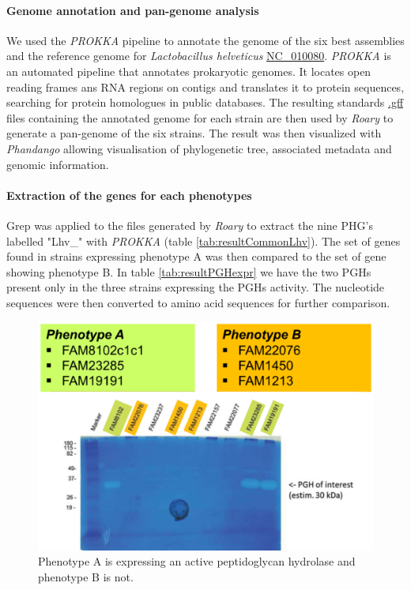 \documentclass[10pt,a4paper]{article}
\begin{document}
\paragraph{Genome annotation and pan-genome analysis}
We used the \textit{PROKKA} pipeline\cite{seemann_prokka:_2014} to annotate the genome of the six best assemblies and the reference genome for \textit{Lactobacillus helveticus} \href{https://www.ncbi.nlm.nih.gov/genome/?term=NC_010080}{NC\_010080}. \textit{PROKKA} is an automated pipeline that annotates prokaryotic genomes. It locates open reading frames ans RNA regions on contigs and translates it to protein sequences, searching for protein homologues in public databases. The resulting standards \href{https://www.ensembl.org/info/website/upload/gff.html}{.gff} files containing the annotated genome for each strain are then used by \textit{Roary}\cite{page_roary:_2015} to generate a pan-genome of the six strains. The result was then visualized with \textit{Phandango}\cite{hadfield_phandango:_2018} allowing visualisation of phylogenetic tree, associated metadata and genomic information.


\paragraph{Extraction of the genes for each phenotypes} Grep was applied to the files generated by \textit{Roary} to extract the nine PHG's \cite{jebava_nine_2011} labelled "Lhv\_" with \textit{PROKKA} (table \ref{tab:resultCommonLhv}). The set of genes found in strains expressing phenotype A was then compared to the set of gene showing phenotype B. In table \ref{tab:resultPGHexpr} we have the two PGHs present only in the three strains expressing the PGHs activity. The nucleotide sequences were then converted to amino acid sequences for further comparison. 


\begin{figure}
	\centering
	\includegraphics[width=0.6\linewidth]{img/zymography}
	\caption[The two phenotypes expressed by the six strains]{Phenotype A is expressing an active peptidoglycan hydrolase and phenotype B is not.}
	\label{fig:zymography}
\end{figure}
\end{document}
